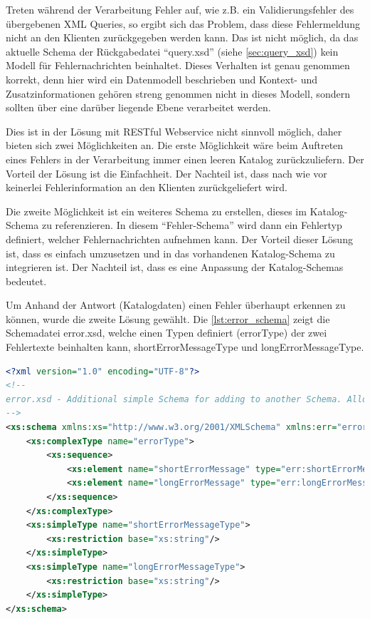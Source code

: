 Treten während der Verarbeitung Fehler auf, wie z.B. ein Validierungsfehler des übergebenen XML Queries, so ergibt sich das Problem, dass diese Fehlermeldung nicht an den Klienten zurückgegeben werden kann. Das ist nicht möglich, da das aktuelle Schema der Rückgabedatei \enquote{query.xsd}  (siehe \autoref{sec:query_xsd}) kein Modell für Fehlernachrichten beinhaltet. 
Dieses Verhalten ist genau genommen korrekt, denn hier wird ein Datenmodell beschrieben und Kontext- und Zusatzinformationen gehören streng genommen nicht in dieses Modell, sondern sollten über eine darüber liegende Ebene verarbeitet werden.

Dies ist in der Lösung mit \gls{REST}ful \gls{Webservice} nicht sinnvoll möglich, daher bieten sich zwei Möglichkeiten an. Die erste Möglichkeit wäre beim Auftreten eines Fehlers in der Verarbeitung immer einen leeren Katalog zurückzuliefern. Der Vorteil der Lösung ist die Einfachheit. Der Nachteil ist, dass nach wie vor keinerlei Fehlerinformation an den Klienten zurückgeliefert wird. 

Die zweite Möglichkeit ist ein weiteres Schema zu erstellen, dieses im Katalog-Schema zu referenzieren. In diesem \enquote{Fehler-Schema} wird dann ein Fehlertyp definiert, welcher Fehlernachrichten aufnehmen kann. Der Vorteil dieser Lösung ist, dass es einfach umzusetzen und in das vorhandenen Katalog-Schema zu integrieren ist. Der Nachteil ist, dass es eine Anpassung der Katalog-Schemas bedeutet. 

Um Anhand der Antwort (Katalogdaten) einen Fehler überhaupt erkennen zu können, wurde die zweite Lösung gewählt. Die \autoref{lst:error_schema} zeigt die Schemadatei error.xsd, welche einen Typen definiert (errorType) der zwei Fehlertexte beinhalten kann, shortErrorMessageType und longErrorMessageType. 

 \begin{lstlisting}[caption=Fehlerbehandlung - Error Schemadatei, language=xml, label=lst:error_schema]
<?xml version="1.0" encoding="UTF-8"?>
<!--
error.xsd - Additional simple Schema for adding to another Schema. Allows Error Messages. 
-->
<xs:schema xmlns:xs="http://www.w3.org/2001/XMLSchema" xmlns:err="error" targetNamespace="error" elementFormDefault="qualified" attributeFormDefault="unqualified">
	<xs:complexType name="errorType">
		<xs:sequence>
			<xs:element name="shortErrorMessage" type="err:shortErrorMessageType" />
			<xs:element name="longErrorMessage" type="err:longErrorMessageType" />
		</xs:sequence>
	</xs:complexType>
	<xs:simpleType name="shortErrorMessageType">
		<xs:restriction base="xs:string"/>
	</xs:simpleType>
	<xs:simpleType name="longErrorMessageType">
		<xs:restriction base="xs:string"/>
	</xs:simpleType>
</xs:schema>
\end{lstlisting}

